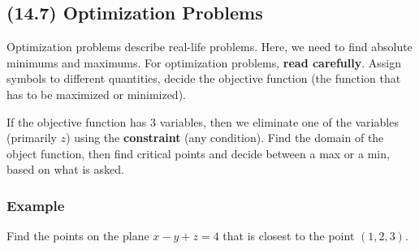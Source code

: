 \documentclass{article}
\begin{document}
\newpage\subsection{(14.7) Optimization Problems}
Optimization problems describe real-life problems. Here, we need to find absolute minimums and maximums.
For optimization problems, \textbf{read carefully}. Assign symbols to different quantities, decide the objective function
(the function that has to be maximized or minimized).

If the objective function has 3 variables, then we eliminate one of the variables (primarily $z$)
using the \textbf{constraint} (any condition). Find the domain of the object function, then find critical
points and decide between a max or a min, based on what is asked.

\subsubsection{Example}
Find the points on the plane $x-y+z=4$ that is closest to the point $(1,2,3)$.
\end{document}
